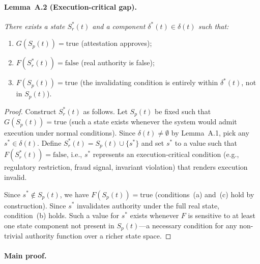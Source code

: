 \documentclass[11pt]{article}
\newcommand{\Sr}{S_r}
\newcommand{\Sp}{S_p}
\begin{document}
\paragraph{Lemma~A.2 (Execution-critical gap).}
\textit{There exists a state $\Sr^*(t)$ and a component $\delta^*(t) \in \delta(t)$
such that:}
\begin{enumerate}[leftmargin=*, label=(\alph*)]
  \item $G(\Sp(t)) = \text{true}$ \quad (attestation approves);
  \item $F(\Sr^*(t)) = \text{false}$ \quad (real authority is false);
  \item $F(\Sp(t)) = \text{true}$ \quad (the invalidating condition is entirely
        within $\delta^*(t)$, not in $\Sp(t)$).
\end{enumerate}

\begin{proof}
Construct $\Sr^*(t)$ as follows.
Let $\Sp(t)$ be fixed such that $G(\Sp(t)) = \text{true}$ (such a state exists
whenever the system would admit execution under normal conditions).
Since $\delta(t) \neq \emptyset$ by Lemma~A.1, pick any $s^* \in \delta(t)$.
Define $\Sr^*(t) = \Sp(t) \cup \{s^*\}$ and set $s^*$ to a value such that
$F(\Sr^*(t)) = \text{false}$, i.e., $s^*$ represents an execution-critical
condition (e.g., regulatory restriction, fraud signal, invariant violation)
that renders execution invalid.

Since $s^* \notin \Sp(t)$, we have $F(\Sp(t)) = \text{true}$ (conditions~(a)
and~(c) hold by construction).
Since $s^*$ invalidates authority under the full real state, condition~(b) holds.
Such a value for $s^*$ exists whenever $F$ is sensitive to at least one
state component not present in $\Sp(t)$---a necessary condition for any
non-trivial authority function over a richer state space.
\end{proof}

\paragraph{Main proof.}
\end{document}
